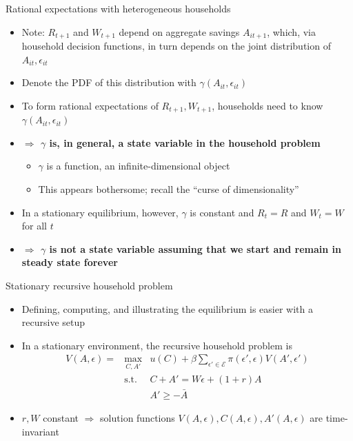 \documentclass[9pt]{beamer}
\newcommand{\bit}{\begin{itemize}}
\newcommand{\eit}{\end{itemize}}
\newcommand{\bc}{\color{blue}}
\begin{document}
\begin{frame}{Rational expectations with heterogeneous households}

\bit
\setlength\itemsep{1.5em}

\item Note: $R_{t+1}$ and $W_{t+1}$ depend on aggregate savings $A_{it+1}$, which, via household decision functions, in turn depends on the joint distribution of $A_{it}, \epsilon_{it}$ 

\item Denote the PDF of this distribution with $\gamma(A_{it}, \epsilon_{it})$

\item To form rational expectations of $R_{t+1}, W_{t+1}$, {\bc households need to know $\gamma(A_{it}, \epsilon_{it})$} 

\item \bf $\Rightarrow$ $\gamma$ is, in general, a state variable in the household problem \normalfont
\bit
\setlength\itemsep{0.5em}
	\item $\gamma$ is a function, an infinite-dimensional object
	\item This appears bothersome; recall the ``curse of dimensionality''
\eit

\item In a stationary equilibrium, however, $\gamma$ is constant and $R_{t}=R$ and $W_{t}=W$ for all $t$

\item \bf $\Rightarrow$ $\gamma$ is not a state variable assuming that we start and remain in steady state forever \normalfont

\eit

\end{frame}

\begin{frame}{Stationary recursive household problem}

\bit
\setlength\itemsep{2em}

\item Defining, computing, and illustrating the equilibrium is easier with a recursive setup

\item In a stationary environment, the recursive household problem is
\begin{eqnarray}
V(A,\epsilon) = &\max_{C, A'}& u(C) + \beta \sum_{\epsilon' \in \mathcal E} \pi(\epsilon', \epsilon) V(A',\epsilon') \nonumber \\
&\text{s.t.} & C + A' =  W\epsilon + (1+r)A  \nonumber \\
&&	A'\geq -\bar A  \nonumber
\end{eqnarray}

\item $r, W$ constant $\Rightarrow$ solution functions $V(A,\epsilon), C(A,\epsilon), A'(A,\epsilon)$ are time-invariant

\eit

\end{frame}
\end{document}
